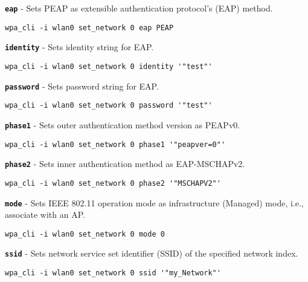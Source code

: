 \noindent
{} \texttt{\bfseries eap} - Sets PEAP as extensible authentication protocol's (EAP) method.

	\begin{lstlisting}[style=framelesstext]
	wpa_cli -i wlan0 set_network 0 eap PEAP
	\end{lstlisting}


\noindent
{} \texttt{\bfseries identity} - Sets identity string for EAP.

	\begin{lstlisting}[style=framelesstext]
	wpa_cli -i wlan0 set_network 0 identity '"test"'
	\end{lstlisting}


\noindent
{} \texttt{\bfseries password} - Sets password string for EAP.

	\begin{lstlisting}[style=framelesstext]
	wpa_cli -i wlan0 set_network 0 password '"test"'
	\end{lstlisting}


\noindent
{} \texttt{\bfseries phase1} - Sets outer authentication method version as PEAPv0.

	\begin{lstlisting}[style=framelesstext]
	wpa_cli -i wlan0 set_network 0 phase1 '"peapver=0"'
	\end{lstlisting}


\noindent
{} \texttt{\bfseries phase2} - Sets inner authentication method as EAP-MSCHAPv2.

	\begin{lstlisting}[style=framelesstext]
	wpa_cli -i wlan0 set_network 0 phase2 '"MSCHAPV2"'
	\end{lstlisting}


\noindent
{} \texttt{\bfseries mode} - Sets IEEE 802.11 operation mode as infrastructure (Managed) mode, i.e., associate with an AP.

    \begin{lstlisting}[style=framelesstext]
    wpa_cli -i wlan0 set_network 0 mode 0
    \end{lstlisting}


\noindent
{} \texttt{\bfseries ssid} - Sets network service set identifier (SSID) of the specified network index. 

    \begin{lstlisting}[style=framelesstext]
    wpa_cli -i wlan0 set_network 0 ssid '"my_Network"'
    \end{lstlisting}


